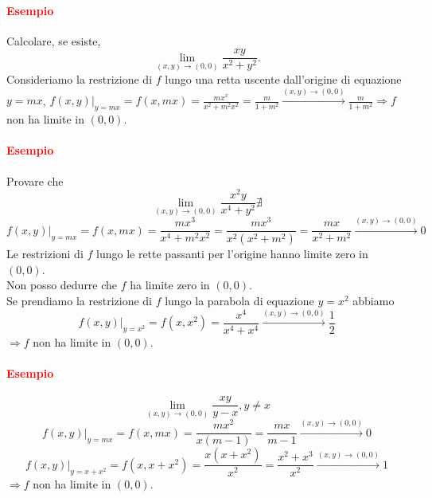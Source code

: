 \documentclass{article}
\begin{document}
\paragraph{\textcolor{red}{Esempio}}
Calcolare, se esiste,
\begin{equation*}
    \lim_{(x,y)\rightarrow(0,0)}\frac{xy}{x^2+y^2}.
\end{equation*}
Consideriamo la restrizione di $f$ lungo una retta uscente dall'origine di equazione $y= mx$, $f(x,y)|_{y=mx}=f(x,mx)=\frac{mx^x}{x^2+m^2x^2}=\frac{m}{1+m^2}\xrightarrow{(x,y)\rightarrow(0,0)}\frac{m}{1+m^2} \Rightarrow f$ non ha limite in $(0,0)$.

\paragraph{\textcolor{red}{Esempio}}
Provare che 
\begin{equation*}
    \lim_{(x,y)\rightarrow(0,0)}\frac{x^2y}{x^4+y^2} \nexists
\end{equation*}
\begin{equation*}
    f(x,y)|_{y=mx}=f(x,mx)=\frac{mx^3}{x^4+m^2x^2}=\frac{mx^3}{x^2(x^2+m^2)}=\frac{mx}{x^2+m^2}\xrightarrow{(x,y)\rightarrow(0,0)}0
\end{equation*}
Le restrizioni di $f$ lungo le rette passanti per l'origine hanno limite zero in $(0,0)$.\\
Non posso dedurre che $f$ ha limite zero in $(0,0)$.\\
Se prendiamo la restrizione di $f$ lungo la parabola di equazione $y=x^2$ abbiamo
\begin{equation*}
    f(x,y)|_{y=x^2}=f(x,x^2)=\frac{x^4}{x^4+x^4}\xrightarrow{(x,y)\rightarrow(0,0)} \frac{1}{2}
\end{equation*}
$\Rightarrow f$ non ha limite in $(0,0)$.

\paragraph{\textcolor{red}{Esempio}}
\begin{equation*}
    \lim_{(x,y)\rightarrow(0,0)} \frac{xy}{y-x}, y \neq x
\end{equation*}
\begin{equation*}
    f(x,y)|_{y=mx}=f(x,mx)=\frac{mx^2}{x(m-1)}=\frac{mx}{m-1}\xrightarrow{(x,y)\rightarrow(0,0)}0
\end{equation*}
\begin{equation*}
    f(x,y)|_{y=x+x^2}=f(x,x+x^2)= \frac{x(x+x^2)}{x^2}=\frac{x^2+x^3}{x^2}\xrightarrow{(x,y)\rightarrow(0,0)}1
\end{equation*}
$\Rightarrow f$ non ha limite in $(0,0)$.
\end{document}
